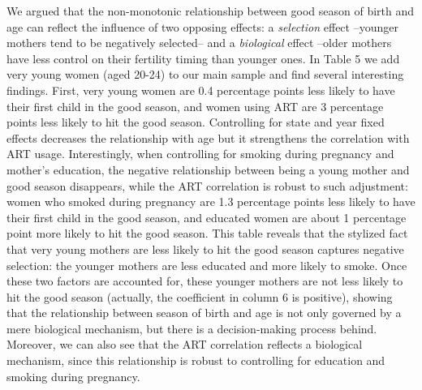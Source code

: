 \documentclass[a4paper, 12 pt]{article}
\theoremstyle{plain}
\begin{document}
\begin{doublespace}
We argued that the non-monotonic relationship between good season of birth and age can reflect the influence of two opposing effects: a \emph{selection} effect --younger mothers tend to be negatively selected-- and a \emph{biological} effect --older mothers have less control on their fertility timing than younger ones. In Table 5 we add very young women (aged 20-24) to our main sample and find several interesting findings. First, very young women are 0.4 percentage points less likely to have their first child in the good season, and women using ART are 3 percentage points less likely to hit the good season. Controlling for state and year fixed effects decreases the relationship with age but it strengthens the correlation with ART usage. Interestingly, when controlling for smoking during pregnancy and mother's education, the negative relationship between being a young mother and good season disappears, while the ART correlation is robust to such adjustment: women who smoked during pregnancy are 1.3 percentage points less likely to have their first child in the good season, and educated women are about 1 percentage point more likely to hit the good season. This table reveals that the stylized fact that very young mothers are less likely to hit the good season captures negative selection: the younger mothers are less educated and more likely to smoke. Once these two factors are accounted for, these younger mothers are not less likely to hit the good season (actually, the coefficient in column 6 is positive), showing that the relationship between season of birth and age is not only governed by a mere biological mechanism, but there is a decision-making process behind. Moreover, we can also see that the ART correlation reflects a biological mechanism, since this relationship is robust to controlling for education and smoking during pregnancy.


\end{doublespace}
\end{document}
